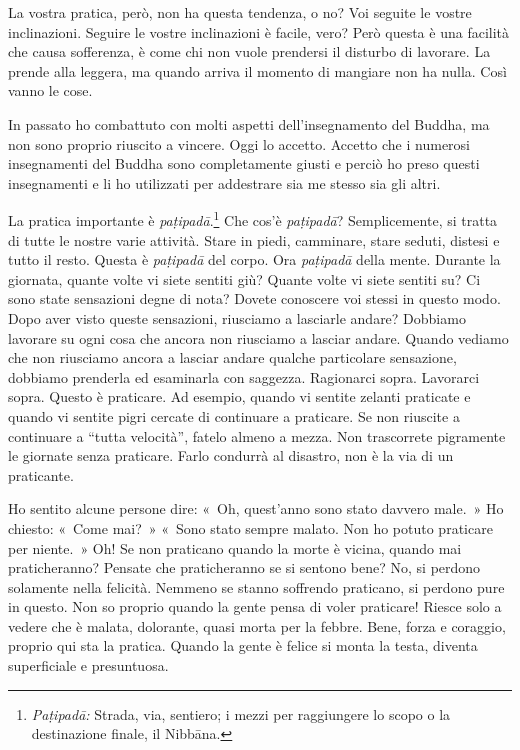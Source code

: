 La vostra pratica, però, non ha questa tendenza, o no? Voi seguite le
vostre inclinazioni. Seguire le vostre inclinazioni è facile, vero? Però
questa è una facilità che causa sofferenza, è come chi non vuole
prendersi il disturbo di lavorare. La prende alla leggera, ma quando
arriva il momento di mangiare non ha nulla. Così vanno le cose.

In passato ho combattuto con molti aspetti dell'insegnamento del Buddha,
ma non sono proprio riuscito a vincere. Oggi lo accetto. Accetto che i
numerosi insegnamenti del Buddha sono completamente giusti e perciò ho
preso questi insegnamenti e li ho utilizzati per addestrare sia me
stesso sia gli altri.

La pratica importante è \emph{paṭipadā}.\footnote{\emph{Paṭipadā:}
  Strada, via, sentiero; i mezzi per raggiungere lo scopo o la
  destinazione finale, il Nibbāna.} Che cos'è \emph{paṭipadā}?
Semplicemente, si tratta di tutte le nostre varie attività. Stare in
piedi, camminare, stare seduti, distesi e tutto il resto. Questa è
\emph{paṭipadā} del corpo. Ora \emph{paṭipadā} della mente. Durante la
giornata, quante volte vi siete sentiti giù? Quante volte vi siete
sentiti su? Ci sono state sensazioni degne di nota? Dovete conoscere voi
stessi in questo modo. Dopo aver visto queste sensazioni, riusciamo a
lasciarle andare? Dobbiamo lavorare su ogni cosa che ancora non
riusciamo a lasciar andare. Quando vediamo che non riusciamo ancora a
lasciar andare qualche particolare sensazione, dobbiamo prenderla ed
esaminarla con saggezza. Ragionarci sopra. Lavorarci sopra. Questo è
praticare. Ad esempio, quando vi sentite zelanti praticate e quando vi
sentite pigri cercate di continuare a praticare. Se non riuscite a
continuare a ``tutta velocità'', fatelo almeno a mezza. Non trascorrete
pigramente le giornate senza praticare. Farlo condurrà al disastro, non
è la via di un praticante.

Ho sentito alcune persone dire: «~Oh, quest'anno sono stato davvero
male.~» Ho chiesto: «~Come mai?~» «~Sono stato sempre malato. Non ho
potuto praticare per niente.~» Oh! Se non praticano quando la morte è
vicina, quando mai praticheranno? Pensate che praticheranno se si
sentono bene? No, si perdono solamente nella felicità. Nemmeno se stanno
soffrendo praticano, si perdono pure in questo. Non so proprio quando la
gente pensa di voler praticare! Riesce solo a vedere che è malata,
dolorante, quasi morta per la febbre. Bene, forza e coraggio, proprio
qui sta la pratica. Quando la gente è felice si monta la testa, diventa
superficiale e presuntuosa.

